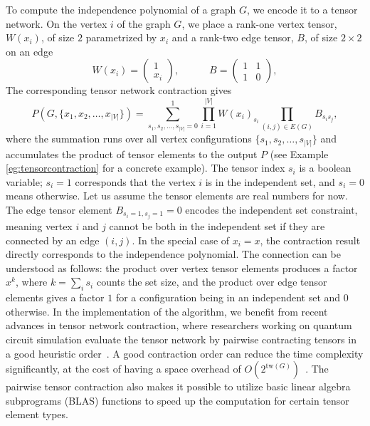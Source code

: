 \documentclass[onefignum, onetabnum]{siamart190516}
\newcommand{\<}{\langle}
\renewcommand{\>}{\rangle}
\newcounter{example}
\begin{document}
To compute the independence polynomial of a graph $G$, we encode it to a tensor network. On the vertex $i$ of the graph $G$, we place a rank-one vertex tensor, $W(x_i)$, of size $2$ parametrized by $x_{i}$ and a rank-two edge tensor, $B$, of size $2 \times 2$ on an edge
\begin{equation}
    W(x_i) = \left(\begin{matrix}
        1 \\
        x_i
    \end{matrix}\right),
    \qquad \quad 
       B = \left(\begin{matrix}
        1  & 1\\
        1 & 0
    \end{matrix}\right), \label{eq:tensor}
\end{equation}
The corresponding tensor network contraction gives
\begin{equation}
    P(G, \{x_1, x_{2}, \ldots,x_{|V|}\}) = \sum\limits_{s_1, s_2, \ldots, s_{|V|} = 0}^{1} \prod\limits_{i=1}^{|V|} W(x_i)_{s_i} \prod\limits_{(i,j) \in E(G)} B_{s_i s_j},
\end{equation}
where the summation runs over all vertex configurations $\{s_1, s_{2}, \ldots,s_{|V|}\}$ and accumulates the product of tensor elements to the output $P$ (see Example \ref{eg:tensorcontraction} for a concrete example).
The tensor index $s_i$ is a boolean variable; $s_{i} = 1$ corresponds that the vertex $i$ is in the independent set, and $s_{i} = 0$ means otherwise. Let us assume the tensor elements are real numbers for now.
The edge tensor element $B_{s_{i}=1, s_{j}=1} = 0$ encodes the independent set constraint, meaning vertex $i$ and $j$ cannot be both in the independent set if they are connected by an edge $(i,j)$.
In the special case of $x_i = x$, the contraction result directly corresponds to the independence polynomial.
The connection can be understood as follows: the product over vertex tensor elements produces a factor $x^k$, where $k=\sum_i s_i$ counts the set size,
and the product over edge tensor elements gives a factor $1$ for a configuration being in an independent set and $0$ otherwise. In the implementation of the algorithm, we benefit from recent advances in tensor network contraction,
where researchers working on quantum circuit simulation evaluate the tensor network by pairwise contracting tensors in a good heuristic order~\cite{Gray2021, Pan2021}.
A good contraction order can reduce the time complexity significantly, at the cost of having a space overhead of $O(2^{\text{tw}(G)})$~\cite{Markov2008}.
The pairwise tensor contraction also makes it possible to utilize basic linear algebra subprograms (BLAS) functions to speed up the computation for certain tensor element types.
\end{document}
